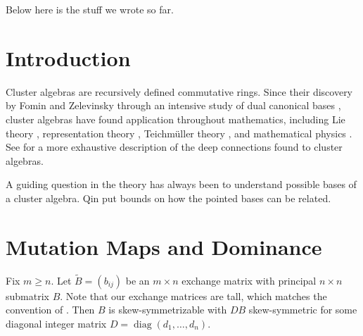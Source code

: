 \documentclass{amsart}
\numberwithin{theorem}{section}
\newcommand{\diag}{\operatorname{diag}}
\begin{document}
Below here is the stuff we wrote so far.

  \section{Introduction}
  Cluster algebras are recursively defined commutative rings.
  Since their discovery by Fomin and Zelevinsky through an intensive study of dual canonical bases \cite{...}, cluster algebras have found application throughout mathematics, including Lie theory \cite{...}, representation theory \cite{...}, Teichm\"uller theory \cite{...}, and mathematical physics \cite{...}.
  See \cite{...} for a more exhaustive description of the deep connections found to cluster algebras.

  A guiding question in the theory has always been to understand possible bases of a cluster algebra.
  Qin put bounds on how the pointed bases can be related.
  


  \section{Mutation Maps and Dominance}
  Fix $m\ge n$.
  Let $\widetilde B=(b_{ij})$ be an $m\times n$ exchange matrix with principal $n\times n$ submatrix $B$.
  Note that our exchange matrices are tall, which matches the convention of \cite{qin}.
  Then $B$ is skew-symmetrizable with $DB$ skew-symmetric for some diagonal integer matrix $D=\diag(d_1,\ldots,d_n)$.
 
\end{document}
